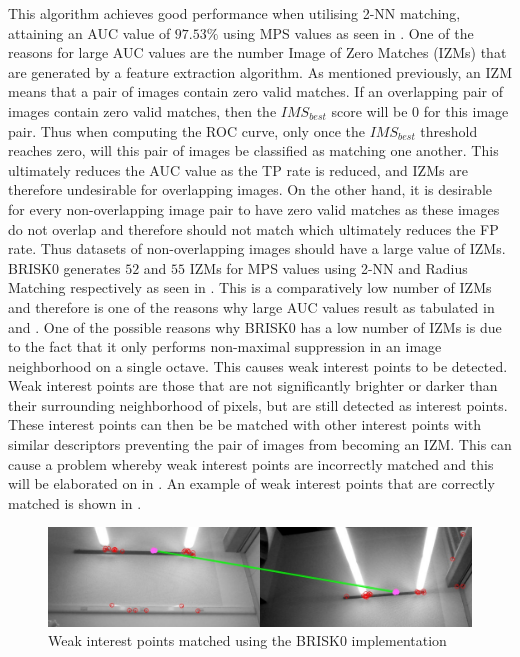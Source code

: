 \documentclass{report}
\begin{document}
This algorithm achieves good performance when utilising 2-NN matching, attaining an AUC value of $97.53\%$ using MPS values as seen in . One of the reasons for large AUC values are the number Image of Zero Matches (IZMs) that are generated by a feature extraction algorithm. As mentioned previously, an IZM means that a pair of images contain zero valid matches. If an overlapping pair of images contain zero valid matches, then the $IMS_{best}$ score will be $0$ for this image pair. Thus when computing the ROC curve, only once the $IMS_{best}$ threshold reaches zero, will this pair of images be classified as matching one another. This ultimately reduces the AUC value as the TP rate is reduced, and IZMs are therefore undesirable for overlapping images. On the other hand, it is desirable for every non-overlapping image pair to have zero valid matches as these images do not overlap and therefore should not match which ultimately reduces the FP rate. Thus datasets of non-overlapping images should have a large value of IZMs.\\

BRISK0 generates $52$ and $55$ IZMs for MPS values using 2-NN and Radius Matching respectively as seen in . This is a comparatively low number of IZMs and therefore is one of the reasons why large AUC values result as tabulated in  and . One of the possible reasons why BRISK0 has a low number of IZMs is due to the fact that it only performs non-maximal suppression in an image neighborhood on a single octave. This causes weak interest points to be detected. Weak interest points are those that are not significantly brighter or darker than their surrounding neighborhood of pixels, but are still detected as interest points. These interest points can then be be matched with other interest points with similar descriptors preventing the pair of images from becoming an IZM. This can cause a problem whereby weak interest points are incorrectly matched and this will be elaborated on in . An example of weak interest points that are correctly matched is shown in .\\

 
\begin{figure}
  \centering
    \includegraphics[width=1.0\textwidth]{../Drawings/Matching/weakInterestPointMatch.jpg}
    \caption{Weak interest points matched using the BRISK0 implementation} 
    \label{fig:weakMatch}
\end{figure}
\end{document}
